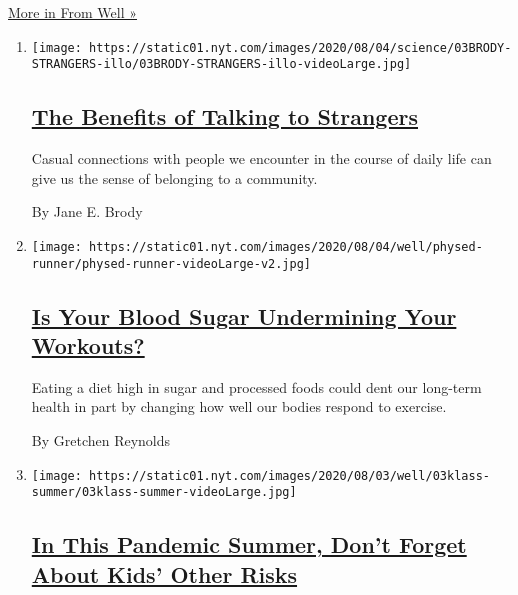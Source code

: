 \href{/section/well}{More in From Well »}

\begin{enumerate}
\def\labelenumi{\arabic{enumi}.}
\item
  \texttt{[image: https://static01.nyt.com/images/2020/08/04/science/03BRODY-STRANGERS-illo/03BRODY-STRANGERS-illo-videoLarge.jpg]}

  \hypertarget{the-benefits-of-talking-to-strangers}{%
  \subsection{\texorpdfstring{\href{/2020/08/03/well/family/the-benefits-of-talking-to-strangers.html}{The
  Benefits of Talking to
  Strangers}}{The Benefits of Talking to Strangers}}\label{the-benefits-of-talking-to-strangers}}

  Casual connections with people we encounter in the course of daily
  life can give us the sense of belonging to a community.

  By Jane E. Brody
\item
  \texttt{[image: https://static01.nyt.com/images/2020/08/04/well/physed-runner/physed-runner-videoLarge-v2.jpg]}

  \hypertarget{is-your-blood-sugar-undermining-your-workouts}{%
  \subsection{\texorpdfstring{\href{/2020/07/29/well/move/blood-sugar-diet-foods-workouts-exercise-muscles.html}{Is
  Your Blood Sugar Undermining Your
  Workouts?}}{Is Your Blood Sugar Undermining Your Workouts?}}\label{is-your-blood-sugar-undermining-your-workouts}}

  Eating a diet high in sugar and processed foods could dent our
  long-term health in part by changing how well our bodies respond to
  exercise.

  By Gretchen Reynolds
\item
  \texttt{[image: https://static01.nyt.com/images/2020/08/03/well/03klass-summer/03klass-summer-videoLarge.jpg]}

  \hypertarget{in-this-pandemic-summer-dont-forget-about-kids-other-risks}{%
  \subsection{\texorpdfstring{\href{/2020/08/03/well/family/children-summer-safety.html}{In
  This Pandemic Summer, Don't Forget About Kids' Other
  Risks}}{In This Pandemic Summer, Don't Forget About Kids' Other Risks}}\label{in-this-pandemic-summer-dont-forget-about-kids-other-risks}}


\end{enumerate}
